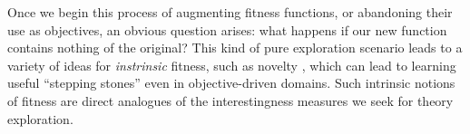 Once we begin this process of augmenting fitness functions, or abandoning their use as objectives, an obvious question arises: what happens if our new function contains nothing of the original? This kind of pure exploration scenario leads to a variety of ideas for \emph{instrinsic} fitness, such as novelty \citep{lehman2011abandoning}, which can lead to learning useful ``stepping stones'' even in objective-driven domains. Such intrinsic notions of fitness are direct analogues of the interestingness measures we seek for theory exploration.
